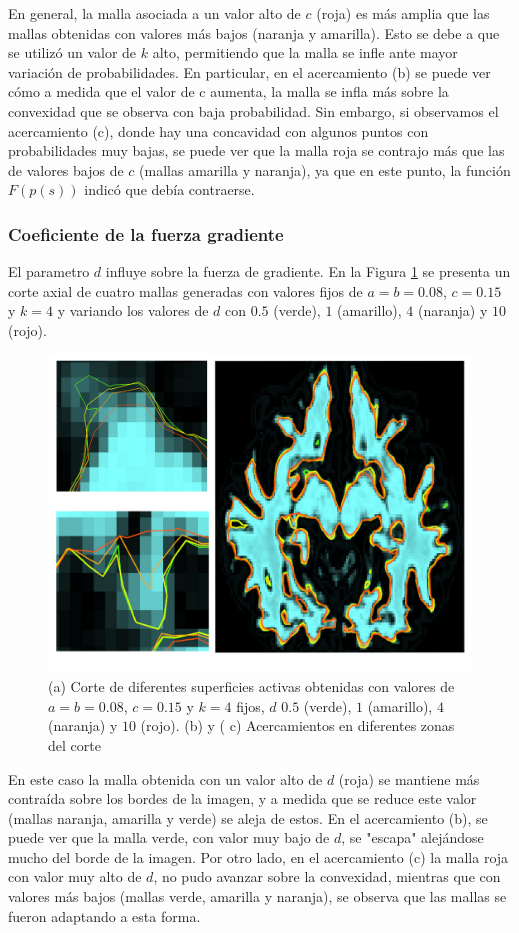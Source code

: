 En general, la malla asociada a un valor alto de  $c$ (roja) es más amplia que las mallas obtenidas con valores más bajos (naranja y amarilla). Esto se debe a que se utilizó un valor de $k$ alto, permitiendo que la malla se infle ante mayor variación de probabilidades. En particular, en el acercamiento (b) se puede ver cómo a medida que el valor de c aumenta, la malla se infla más sobre la convexidad que se observa con baja probabilidad. Sin embargo, si observamos el acercamiento (c), donde hay una concavidad con algunos puntos con probabilidades muy bajas, se puede ver que la malla roja se contrajo más que las de valores bajos de $c$ (mallas amarilla y naranja), ya que en este punto, la función $F(p(s))$ indicó que debía contraerse.

\subsubsection{Coeficiente de la fuerza gradiente}
El parametro $d$ influye sobre la fuerza de gradiente. En la Figura \ref{fig:sensibilidad6} se presenta un corte axial de cuatro mallas generadas con valores fijos de $a=b=0.08$, $c=0.15$ y $k=4$ y variando los valores de $d$ con $0.5$ (verde), $1$ (amarillo), $4$ (naranja) y $10$ (rojo).

\begin{figure}[h!]
	\centering
	\includegraphics[scale=0.05]{images/sensibilidad6.jpg}
	\caption{(a) Corte de diferentes superficies activas obtenidas con valores de $a=b=0.08$, $c=0.15$ y $k=4$ fijos, $d$ $0.5$ (verde), $1$ (amarillo), $4$ (naranja) y $10$ (rojo). (b) y ( c) Acercamientos en diferentes zonas del corte}
	\label{fig:sensibilidad6}
\end{figure}

En este caso la malla obtenida con un valor alto de $d$ (roja) se mantiene más contraída sobre los bordes de la imagen, y a medida que se reduce este valor (mallas naranja, amarilla y verde) se aleja de estos. En el acercamiento (b), se puede ver que la malla verde, con valor muy bajo de $d$, se "escapa" alejándose mucho del borde de la imagen. Por otro lado, en el acercamiento (c) la malla roja con valor muy alto de $d$, no pudo avanzar sobre la convexidad, mientras que con valores más bajos (mallas verde, amarilla y naranja), se observa que las mallas se fueron adaptando a esta forma.

